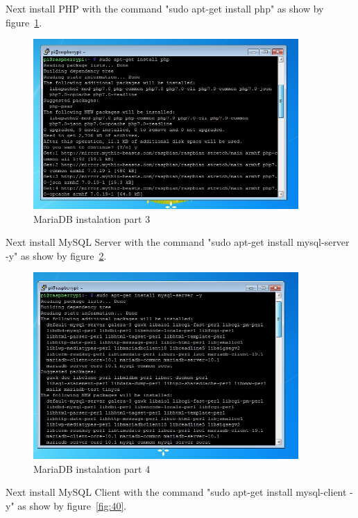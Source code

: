\documentclass[12pt,]{article}
\begin{document}
Next install PHP with the command "sudo apt-get install php" as show by figure~\ref{fig:38}.
\begin{figure}[H]
  	\begin{center}
    	\includegraphics[width=0.9\textwidth]{Ras_20}
  	\end{center}
  	\caption{MariaDB instalation part 3}
	\label{fig:38}
\end{figure}
Next install MySQL Server with the command "sudo apt-get install mysql-server -y" as show by figure~\ref{fig:39}.
\begin{figure}[H]
  	\begin{center}
    	\includegraphics[width=0.9\textwidth]{Ras_21}
  	\end{center}
  	\caption{MariaDB instalation part 4}
	\label{fig:39}
\end{figure}
Next install MySQL Client with the command "sudo apt-get install mysql-client -y" as show by figure~\ref{fig:40}.
\end{document}
